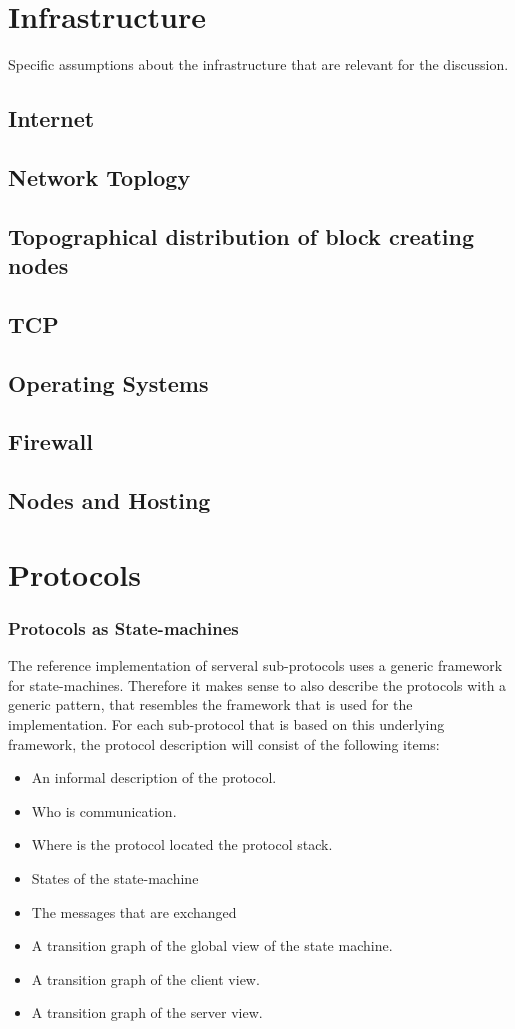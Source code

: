 \documentclass{report}
\theoremstyle{definition}{
  \newtheorem{lemma}{Lemma}[section] %
  \newtheorem{definition}[lemma]{Definition}
}
\theoremstyle{theorem}{
  \newtheorem{invariant}[lemma]{Invariant}
  \newtheorem{proofobligation}[lemma]{Proof Obligation}
}
\numberwithin{equation}{lemma}
\begin{document}
\chapter{Infrastructure}
Specific assumptions about the infrastructure that are relevant for the discussion.

\section{Internet}
\section{Network Toplogy}
\section{Topographical distribution of block creating nodes}
\section{TCP}

\section{Operating Systems}
\section{Firewall}
\section{Nodes and Hosting}

\chapter{Protocols}
\subsection{Protocols as State-machines}
The reference implementation of serveral sub-protocols uses a generic framework
for state-machines.
Therefore it makes sense to also describe the protocols with a generic pattern,
that resembles the framework that is used for the implementation.
For each sub-protocol that is based on this underlying framework, the protocol description
will consist of the following items:

\begin{itemize}
\item An informal description of the protocol.
\item Who is communication.
\item Where is the protocol located the protocol stack.
\item States of the state-machine
\item The messages that are exchanged
\item A transition graph of the global view of the state machine.
\item A transition graph of the client view.
\item A transition graph of the server view.
\end{itemize}
  
\end{document}

